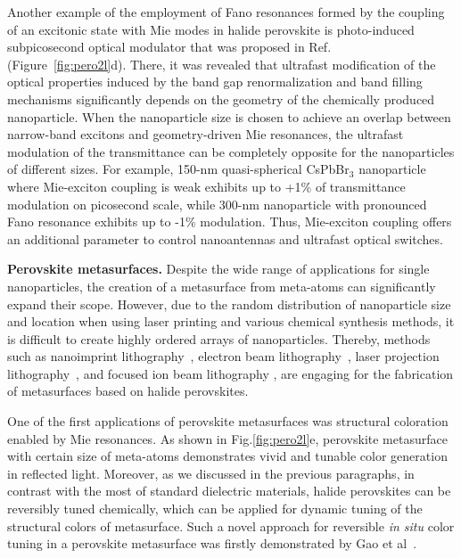\documentclass[journal=chreay,manuscript=review]{achemso}
\begin{document}
Another example of the employment of Fano resonances formed by the coupling of an excitonic state with Mie modes in halide perovskite is photo-induced subpicosecond optical modulator that was proposed in Ref.~ (Figure~\ref{fig:pero2l}d). There, it was revealed that ultrafast modification of the optical properties induced by the band gap renormalization and band filling mechanisms significantly depends on the geometry of the chemically produced nanoparticle. When the nanoparticle size is chosen to achieve an overlap between narrow-band excitons and geometry-driven Mie resonances, the ultrafast modulation of the transmittance can be completely opposite for the nanoparticles of different sizes. For example, 150-nm quasi-spherical CsPbBr$_3$ nanoparticle where Mie-exciton coupling is weak exhibits up to +1\% of transmittance modulation on picosecond scale, while 300-nm nanoparticle with pronounced Fano resonance exhibits up to -1\% modulation. Thus, Mie-exciton coupling offers an additional parameter to control nanoantennas and ultrafast optical switches.


\textbf{Perovskite metasurfaces.}
Despite the wide range of applications for single nanoparticles, the creation of a metasurface from meta-atoms can significantly expand their scope. However, due to the random distribution of nanoparticle size and location when using laser printing and various chemical synthesis methods, it is difficult to create highly ordered arrays of nanoparticles. Thereby, methods such as nanoimprint lithography~\cite{makarov2017multifold, wang2016nanoimprinted}, electron beam lithography~\cite{fan2021enhanced, zhang2019lead}, laser projection lithography~\cite{zhizhchenko2020light, zhizhchenko2021direct}, and focused ion beam lithography \cite{baryshnikova2020broadband, gholipour2017organometallic}, are engaging for the fabrication of metasurfaces based on halide perovskites. 

One of the first applications of perovskite metasurfaces was structural coloration~\citep{gholipour2017organometallic} enabled by Mie resonances. As shown in Fig.\ref{fig:pero2l}e, perovskite metasurface with certain size of meta-atoms demonstrates vivid and tunable color generation in reflected light. Moreover, as we discussed in the previous paragraphs, in contrast with the most of standard dielectric materials, halide perovskites can be reversibly tuned chemically, which can be applied for dynamic tuning of the structural colors of metasurface. 
Such a novel approach for reversible \textit{in situ} color tuning in a perovskite metasurface was firstly demonstrated by Gao et al~\cite{gao2018lead}.
\end{document}

